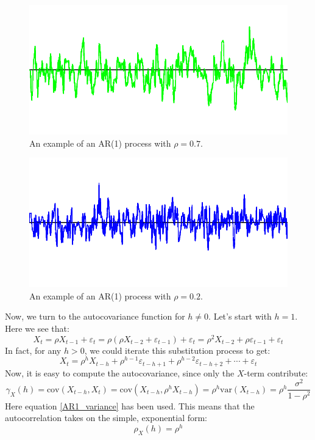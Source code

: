 \documentclass[12pt, a4paper]{article}
\numberwithin{equation}{section}
\begin{document}
\begin{figure}
\centering
\includegraphics[width=\textwidth]{ar1_70}
\caption{An example of an AR(1) process with $\rho=0.7$.}
\label{fig:ar1_70}
\end{figure}

\begin{figure}
\centering
\includegraphics[width=\textwidth]{ar1_20}
\caption{An example of an AR(1) process with $\rho=0.2$.}
\label{fig:ar1_20}
\end{figure}

Now, we turn to the autocovariance function for $h\neq 0$. Let's start with $h=1$. Here we see that:
\begin{equation}
X_t=\rho X_{t-1}+\varepsilon_t=\rho(\rho X_{t-2}+\varepsilon_{t-1})+\varepsilon_t=\rho^2 X_{t-2}+\rho\varepsilon_{t-1}+\varepsilon_t
\end{equation}
In fact, for any $h>0$, we could iterate this substitution process to get:
\begin{equation}
X_t=\rho^h X_{t-h}+\rho^{h-1}\varepsilon_{t-h+1}+\rho^{h-2}\varepsilon_{t-h+2}+\cdots+\varepsilon_t
\end{equation}
Now, it is easy to compute the autocovariance, since only the $X$-term contribute:
\begin{equation}
\gamma_X(h)=\textrm{cov}(X_{t-h},X_t)=\textrm{cov}(X_{t-h},\rho^h X_{t-h})=\rho^h\textrm{var}(X_{t-h})=\rho^h\frac{\sigma^2}{1-\rho^2}
\end{equation}
Here equation \ref{AR1_variance} has been used. This means that the autocorrelation takes on the simple, exponential form:
\begin{equation}
\rho_X(h)=\rho^h
\end{equation}
\end{document}
